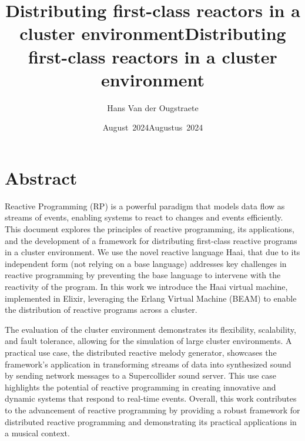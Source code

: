 \documentclass[a4paper]{book}
\title{Distributing first-class reactors in a cluster environment}
\author{Hans Van der Ougstraete}
\date{August~2024}
\begin{document}
\frontmatter
\maketitle%

\title{Distributing first-class reactors in a cluster environment}
%
\date{Augustus~2024}%
%
\maketitle%

\chapter{Abstract}
Reactive Programming (RP) is a powerful paradigm that models data flow as streams of events, enabling systems to react to changes and events efficiently. This document explores the principles of reactive programming, its applications, and the development of a framework for distributing first-class reactive programs in a cluster environment. We use the novel reactive language Haai, that due to its independent form (not relying on a base language) addresses key challenges in reactive programming by preventing the base language to intervene with the reactivity of the program. In this work we introduce the Haai virtual machine, implemented in Elixir, leveraging the Erlang Virtual Machine (BEAM) to enable the distribution of reactive programs across a cluster.

The evaluation of the cluster environment demonstrates its flexibility, scalability, and fault tolerance, allowing for the simulation of large cluster environments. A practical use case, the distributed reactive melody generator, showcases the framework's application in transforming streams of data into synthesized sound by sending network messages to a Supercollider sound server. This use case highlights the potential of reactive programming in creating innovative and dynamic systems that respond to real-time events. Overall, this work contributes to the advancement of reactive programming by providing a robust framework for distributed reactive programming and demonstrating its practical applications in a musical context.
\end{document}
